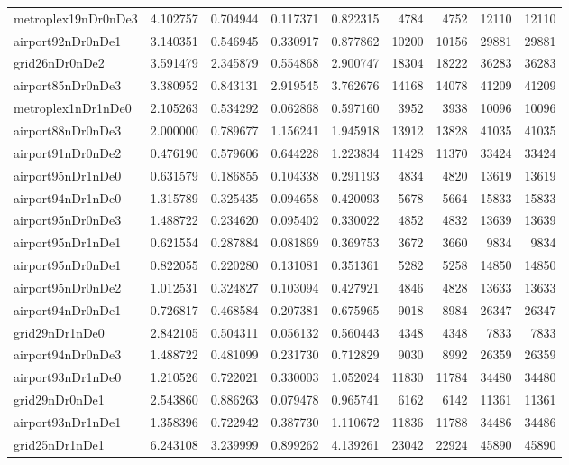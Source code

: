 \begin{longtable}{|l|r|r|r|r|r|r|r|r|}
metroplex19nDr0nDe3 & 4.102757 & 0.704944 & 0.117371 & 0.822315 & 4784 & 4752 & 12110 & 12110 \\
airport92nDr0nDe1 & 3.140351 & 0.546945 & 0.330917 & 0.877862 & 10200 & 10156 & 29881 & 29881 \\
grid26nDr0nDe2 & 3.591479 & 2.345879 & 0.554868 & 2.900747 & 18304 & 18222 & 36283 & 36283 \\
airport85nDr0nDe3 & 3.380952 & 0.843131 & 2.919545 & 3.762676 & 14168 & 14078 & 41209 & 41209 \\
metroplex1nDr1nDe0 & 2.105263 & 0.534292 & 0.062868 & 0.597160 & 3952 & 3938 & 10096 & 10096 \\
airport88nDr0nDe3 & 2.000000 & 0.789677 & 1.156241 & 1.945918 & 13912 & 13828 & 41035 & 41035 \\
airport91nDr0nDe2 & 0.476190 & 0.579606 & 0.644228 & 1.223834 & 11428 & 11370 & 33424 & 33424 \\
airport95nDr1nDe0 & 0.631579 & 0.186855 & 0.104338 & 0.291193 & 4834 & 4820 & 13619 & 13619 \\
airport94nDr1nDe0 & 1.315789 & 0.325435 & 0.094658 & 0.420093 & 5678 & 5664 & 15833 & 15833 \\
airport95nDr0nDe3 & 1.488722 & 0.234620 & 0.095402 & 0.330022 & 4852 & 4832 & 13639 & 13639 \\
airport95nDr1nDe1 & 0.621554 & 0.287884 & 0.081869 & 0.369753 & 3672 & 3660 & 9834 & 9834 \\
airport95nDr0nDe1 & 0.822055 & 0.220280 & 0.131081 & 0.351361 & 5282 & 5258 & 14850 & 14850 \\
airport95nDr0nDe2 & 1.012531 & 0.324827 & 0.103094 & 0.427921 & 4846 & 4828 & 13633 & 13633 \\
airport94nDr0nDe1 & 0.726817 & 0.468584 & 0.207381 & 0.675965 & 9018 & 8984 & 26347 & 26347 \\
grid29nDr1nDe0 & 2.842105 & 0.504311 & 0.056132 & 0.560443 & 4348 & 4348 & 7833 & 7833 \\
airport94nDr0nDe3 & 1.488722 & 0.481099 & 0.231730 & 0.712829 & 9030 & 8992 & 26359 & 26359 \\
airport93nDr1nDe0 & 1.210526 & 0.722021 & 0.330003 & 1.052024 & 11830 & 11784 & 34480 & 34480 \\
grid29nDr0nDe1 & 2.543860 & 0.886263 & 0.079478 & 0.965741 & 6162 & 6142 & 11361 & 11361 \\
airport93nDr1nDe1 & 1.358396 & 0.722942 & 0.387730 & 1.110672 & 11836 & 11788 & 34486 & 34486 \\
grid25nDr1nDe1 & 6.243108 & 3.239999 & 0.899262 & 4.139261 & 23042 & 22924 & 45890 & 45890 \\

\end{longtable}

